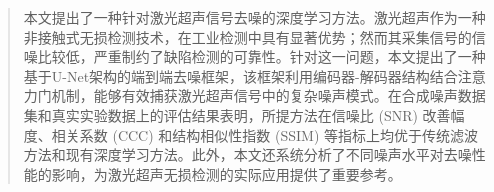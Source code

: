 \begin{abstract}
本文提出了一种针对激光超声信号去噪的深度学习方法。激光超声作为一种非接触式无损检测技术，在工业检测中具有显著优势；然而其采集信号的信噪比较低，严重制约了缺陷检测的可靠性。针对这一问题，本文提出了一种基于U-Net架构的端到端去噪框架，该框架利用编码器-解码器结构结合注意力门机制，能够有效捕获激光超声信号中的复杂噪声模式。在合成噪声数据集和真实实验数据上的评估结果表明，所提方法在信噪比 (SNR) 改善幅度、相关系数 (CCC) 和结构相似性指数 (SSIM) 等指标上均优于传统滤波方法和现有深度学习方法。此外，本文还系统分析了不同噪声水平对去噪性能的影响，为激光超声无损检测的实际应用提供了重要参考。

\end{abstract}